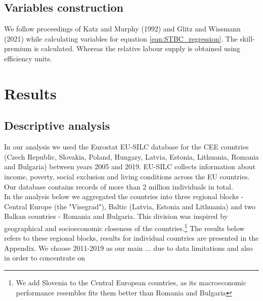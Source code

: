 \documentclass{article}
\begin{document}
\subsection{Variables construction}
We follow proceedings of Katz and Murphy (1992) and Glitz and Wissmann (2021) while calculating variables for equation \ref{eqn:STBC_regression}. The skill-premium is calculated. Whereas the relative labour supply is obtained using efficiency units.


\section{Results}
\subsection{Descriptive analysis}
In our analysis we used the Eurostat EU-SILC database for the CEE countries (Czech Republic, Slovakia, Poland, Hungary, Latvia, Estonia, Lithuania, Romania and Bulgaria) between years 2005 and 2019. EU-SILC collects information about income, poverty, social exclusion and living conditions across the EU countries. Our database contains records of more than 2 million individuals in total.\\ In the analysis below we aggregated the countries into three regional blocks - Central Europe (the "Visegrad"), Baltic (Latvia, Estonia and Lithuania) and two Balkan countries - Romania and Bulgaria. This division was inspired by geographical and socioeconomic closeness of the countries.\footnote{We add Slovenia to the Central European countries, as its macroeconomic performance resembles fits them better than Romania and Bulgaria} %
The results below refers to these regional blocks, results for individual countries are presented in the Appendix. We choose 2011-2019 as our main ... due to data limitations and also in order to concentrate on 
\end{document}
